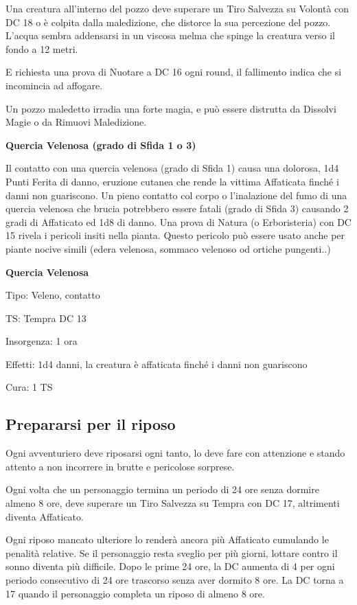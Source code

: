 \begin{multicols}{2}
Una creatura all'interno del pozzo deve superare un Tiro Salvezza su Volontà con DC 18 o è colpita dalla maledizione, che distorce la sua percezione del pozzo. L'acqua sembra addensarsi in un viscosa melma che spinge la creatura verso il fondo a 12 metri.

E richiesta una prova di Nuotare a DC 16 ogni round, il fallimento indica che si incomincia ad affogare.

Un pozzo maledetto irradia una forte magia, e può essere distrutta da Dissolvi Magie o da Rimuovi Maledizione.

\medskip
\textbf{Quercia Velenosa (grado di Sfida 1 o 3)}

Il contatto con una quercia velenosa (grado di Sfida 1) causa una dolorosa, 1d4 Punti Ferita di danno, eruzione cutanea che rende la vittima Affaticata finché i danni non guariscono. Un pieno contatto col corpo o l'inalazione del fumo di una quercia velenosa che brucia potrebbero essere fatali (grado di Sfida 3) causando 2 gradi di Affaticato ed 1d8 di danno.
Una prova di Natura (o Erboristeria) con DC 15 rivela i pericoli insiti nella pianta. Questo pericolo può essere usato anche per piante nocive simili (edera velenosa, sommaco velenoso od ortiche pungenti..)

\textbf{Quercia Velenosa}

Tipo: Veleno, contatto

TS: Tempra DC 13

Insorgenza: 1 ora

Effetti: 1d4 danni, la creatura è affaticata finché i danni non guariscono

Cura: 1 TS

\subsection{Prepararsi per il riposo}

Ogni avventuriero deve riposarsi ogni tanto, lo deve fare con attenzione e stando attento a non incorrere in brutte e pericolose sorprese.

Ogni volta che un personaggio termina un periodo di 24 ore senza dormire almeno 8 ore, deve superare un Tiro Salvezza su Tempra con DC 17, altrimenti diventa Affaticato.

Ogni riposo mancato ulteriore lo renderà ancora più Affaticato cumulando le penalità relative. Se il personaggio resta sveglio per più giorni, lottare contro il sonno diventa più difficile. Dopo le prime 24 ore, la DC aumenta di 4 per ogni periodo consecutivo di 24 ore trascorso senza aver dormito 8 ore. La DC torna a 17 quando il personaggio completa un riposo di almeno 8 ore.


\end{multicols}
